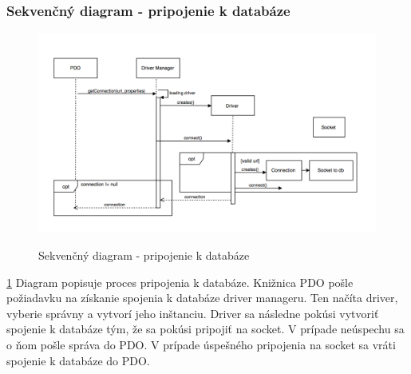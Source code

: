\documentclass[12pt,a4paper]{article}
\begin{document}
\subsubsection{Sekvenčný diagram -  pripojenie k databáze}
\begin{figure}[H]
	\caption{Sekvenčný diagram - pripojenie k databáze}
	\includegraphics[width=\textwidth]{db}
	\label{fig:db}
\end{figure}
\ref{fig:db}
Diagram popisuje proces pripojenia k databáze. Knižnica PDO pošle požiadavku na získanie spojenia k databáze driver manageru. Ten načíta driver, vyberie správny a vytvorí jeho inštanciu. Driver sa následne pokúsi vytvoriť spojenie k databáze tým, že sa pokúsi pripojiť na socket. V prípade neúspechu sa o ňom pošle správa do PDO. V prípade úspešného pripojenia na socket sa vráti spojenie k databáze do PDO.
\end{document}
